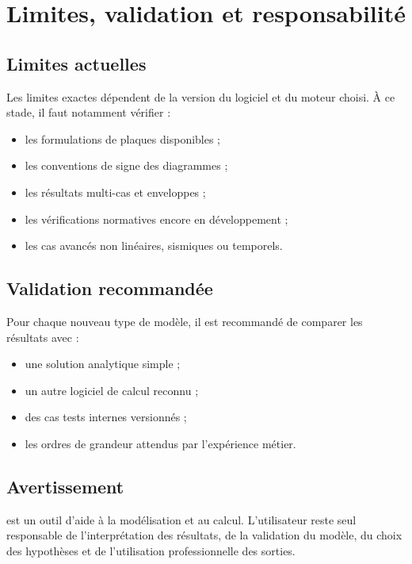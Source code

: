 \chapter{Limites, validation et responsabilité}

\section{Limites actuelles}

Les limites exactes dépendent de la version du logiciel et du moteur choisi. À
ce stade, il faut notamment vérifier :

\begin{itemize}
  \item les formulations de plaques disponibles ;
  \item les conventions de signe des diagrammes ;
  \item les résultats multi-cas et enveloppes ;
  \item les vérifications normatives encore en développement ;
  \item les cas avancés non linéaires, sismiques ou temporels.
\end{itemize}

\section{Validation recommandée}

Pour chaque nouveau type de modèle, il est recommandé de comparer les résultats
avec :

\begin{itemize}
  \item une solution analytique simple ;
  \item un autre logiciel de calcul reconnu ;
  \item des cas tests internes versionnés ;
  \item les ordres de grandeur attendus par l'expérience métier.
\end{itemize}

\section{Avertissement}

\begin{warningbox}
\logiciel{} est un outil d'aide à la modélisation et au calcul. L'utilisateur
reste seul responsable de l'interprétation des résultats, de la validation du
modèle, du choix des hypothèses et de l'utilisation professionnelle des sorties.
\end{warningbox}

